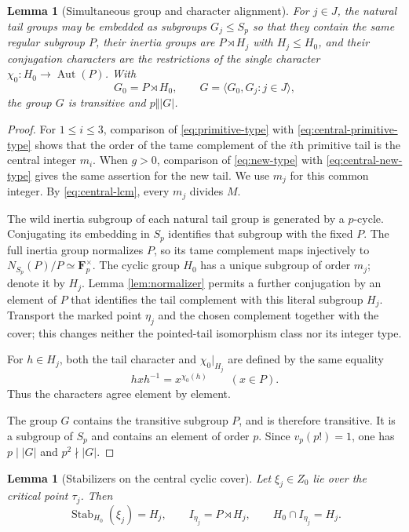 \documentclass[11pt]{amsart}
\theoremstyle{plain}
\newtheorem{lemma}[theorem]{Lemma}
\theoremstyle{definition}
\numberwithin{equation}{section}
\begin{document}
\begin{lemma}[Simultaneous group and character alignment]
\label{lem:group-alignment}
For $j\in J$, the natural tail groups may be embedded as subgroups
$G_j\leq S_p$ so that
they contain the same regular subgroup $P$, their inertia groups are
$P\rtimes H_j$ with $H_j\leq H_0$, and their conjugation characters are
the restrictions of the single character
$\chi_0:H_0\to\operatorname{Aut}(P)$.  With
\[
 G_0=P\rtimes H_0,\qquad
 G=\langle G_0,G_j:j\in J\rangle,
\]
the group $G$ is transitive and $p\Vert |G|$.
\end{lemma}

\begin{proof}
For $1\leq i\leq3$, comparison of
\eqref{eq:primitive-type} with
\eqref{eq:central-primitive-type} shows that the order of the tame
complement of the $i$th primitive tail is the central integer $m_i$.
When $g>0$, comparison of \eqref{eq:new-type} with
\eqref{eq:central-new-type} gives the same assertion for the new tail.
We use $m_j$ for this common integer.  By
\eqref{eq:central-lcm}, every $m_j$ divides $M$.

The wild inertia subgroup of each natural tail group is generated by a
$p$-cycle.  Conjugating its embedding in $S_p$ identifies that subgroup
with the fixed $P$.  The full inertia group normalizes $P$, so its tame
complement maps injectively to
$N_{S_p}(P)/P\simeq\mathbf F_p^\times$.  The cyclic group
$H_0$ has a unique subgroup of order $m_j$; denote it by $H_j$.  Lemma
\ref{lem:normalizer} permits a further conjugation by an element of $P$ that
identifies the tail complement with this literal subgroup $H_j$.  Transport
the marked point $\eta_j$ and the chosen complement together with the
cover; this changes neither the pointed-tail isomorphism class nor its
integer type.

For $h\in H_j$, both the tail character and $\chi_0|_{H_j}$ are defined by
the same equality
\[
 hxh^{-1}=x^{\chi_0(h)}\qquad(x\in P).
\]
Thus the characters agree element by element.

The group $G$ contains the transitive subgroup $P$, and is therefore
transitive.  It is a subgroup of $S_p$ and contains an element of order $p$.
Since $v_p(p!)=1$, one has $p\mid |G|$ and $p^2\nmid |G|$.
\end{proof}

\begin{lemma}[Stabilizers on the central cyclic cover]
\label{lem:central-stabilizers}
Let $\xi_j\in Z_0$ lie over the critical point $\tau_j$.  Then
\[
 \operatorname{Stab}_{H_0}(\xi_j)=H_j,
 \qquad I_{\eta_j}=P\rtimes H_j,
 \qquad H_0\cap I_{\eta_j}=H_j.
\]
\end{lemma}
\end{document}
